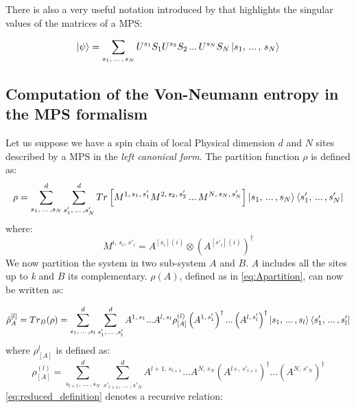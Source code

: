 \documentclass[11pt]{article}
\theoremstyle{definition}
\begin{document}
There is also a very useful notation introduced by \cite{Vidal_2003} that highlights the singular values of the matrices of a MPS:

\begin{equation} \label{eq:vidal_form}
\ket \psi = \sum_{s_1, \, ... \, , \, s_N} U^{s_1} S_{1}U^{s_2} S_{2} \, ... \, U^{s_N} S_{N} \ket{s_1, \, ... \, , \, s_N}
\end{equation}



\subsection{Computation of the Von-Neumann entropy in the MPS formalism}

Let us suppose we have a spin chain of local Physical dimension $d$ and $N$ sites described by a MPS in the  \textit{left canonical form}. The partition function $\rho$ is defined as:
\begin{equation}
\rho = \sum^d_{s_1, \, ... \, , s_N }\sum^d_{s'_1, \, ... \, , s'_N }Tr\left[ M^{1,\, s_1, \, s'_1} M^{2, \, s_2,\, s'_2} \, ... \, M^{N, \, s_N,\, s'_N} \right]\ket{s_1, \, ... \, , s_N} \bra{s'_1, \, ... \, , s'_N}
\end{equation}
where:
\begin{equation}
M^{i,\, s_i, \, s'_i} = A^{[s_i](i)} \otimes \left(A^{[s'_i](i)} \right)^\dag
\end{equation}
We now partition the system in two sub-system $A$ and $B$. $A$ includes all the sites up to \textit{k} and $B$ its complementary. 
$\rho(A)$, defined as in \autoref{eq:Apartition}, can now be written as:

\begin{equation} 
\tilde{\rho}_A^{[l]}=Tr_B(\rho)= \sum^d_{s_1, \, ... \, , s_l }\sum^d_{s'_1, \, ... \, , s'_l }  A^{1, \, s_1} ... A^{l, \, s_l} \rho^{(l)}_{[A]}  \left( A^{1, \, s'_1} \right)^\dag ... \left(A^{l, \, s'_l}\right)^\dag \ket{s_1, \, ... \, , s_l} \bra{s'_1, \, ... \, , s'_l}
\end{equation}
where $\rho^l_{[A]}$ is defined as:
\begin{equation}\label{eq:reduced_definition}
\rho^{(l)}_{[A]}= \sum^d_{s_{l+1}, \, ... \, , s_N }\sum^d_{s'_{l+1}, \, ... \, , s'_N }  A^{l+1, \, s_{l+1}} ... A^{N, \, s_N}  \left( A^{l+, \, s'_{l+1}} \right)^\dag ... \left(A^{N, \, s'_N}\right)^\dag
\end{equation}
\autoref{eq:reduced_definition} denotes a recursive relation:
\end{document}
